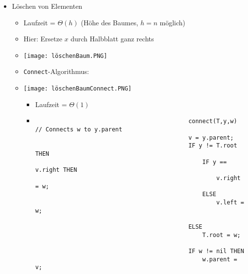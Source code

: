 \begin{itemize}
\begin{itemize}
                    \item Löschen von Elementen
                        \begin{itemize}
                            \item Laufzeit = $\Theta(h)$ (Höhe des Baumes, $h=n$ möglich)
                            \item Hier: Ersetze $x$ durch Halbblatt ganz rechts
                            \item[] \texttt{[image: löschenBaum.PNG]}
                            \item \texttt{Connect}-Algorithmus:
                            \item[]
                                \begin{minipage}[t]{0.35\textwidth}
                                    \texttt{[image: löschenBaumConnect.PNG]}
                                \end{minipage}
                                \begin{minipage}[t]{0.45\textwidth}
                                    \vspace{-7cm}
                                    \begin{itemize}
                                        \item Laufzeit = $\Theta(1)$
                                        \item[]
                                            \begin{verbatim}
                                            connect(T,y,w) // Connects w to y.parent
                                            v = y.parent;
                                            IF y != T.root THEN 
                                                IF y == v.right THEN 
                                                    v.right = w;
                                                ELSE 
                                                    v.left = w;
                                            
                                            ELSE 
                                                T.root = w;
                                            
                                            IF w != nil THEN 
                                                w.parent = v;
                                            \end{verbatim}
                                    \end{itemize}
                                \end{minipage}


\end{itemize}
\end{itemize}
\end{itemize}
